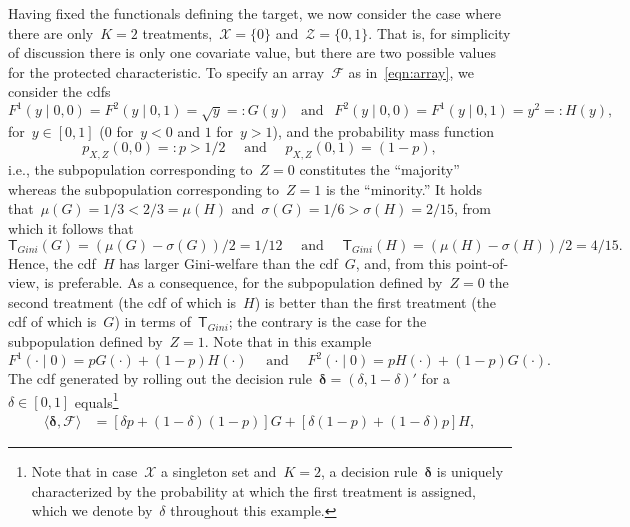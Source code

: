 \documentclass[11pt, a4paper]{article}
\theoremstyle{definition}
\begin{document}
Having fixed the functionals defining the target, we now consider the case where there are only~$K = 2$ treatments,~$\mathcal{X} = \{0\}$ and~$\mathcal{Z} = \{0, 1\}$. That is, for simplicity of discussion there is only one covariate value, but there are two possible values for the protected characteristic. To specify an array~$\mathcal{F}$ as in~\eqref{eqn:array}, we consider the cdfs
%
\begin{equation}\label{eqn:exFdef}
F^1(y\mid 0, 0) = F^2(y\mid 0, 1) = \sqrt{y} =: G(y)  ~~ \text{ and } ~~ F^2(y\mid 0, 0) =  F^1(y\mid 0, 1) = y^2 =: H(y),
\end{equation}
%
for~$y \in [0, 1]$ ($0$ for~$y < 0$ and $1$ for~$y > 1$), and the probability mass function~$$p_{X, Z}(0, 0) =: p > 1/2\quad \text{ and } \quad p_{X, Z}(0, 1) = (1-p),$$ i.e., the subpopulation corresponding to~$Z = 0$ constitutes the ``majority'' whereas the subpopulation corresponding to~$Z = 1$ is the ``minority.'' It holds that~$\mu(G) = 1/3 < 2/3 = \mu(H)$ and~$\sigma(G) = 1/6 > \sigma(H) = 2/15$, from which it follows that~$$\mathsf{T}_{Gini}(G) = (\mu(G) - \sigma(G))/2 = 1/12 \quad \text{ and } \quad \mathsf{T}_{Gini}(H) = (\mu(H) - \sigma(H))/2 = 4/15.$$ Hence, the cdf~$H$ has larger Gini-welfare than the cdf~$G$, and, from this point-of-view, is preferable. As a consequence, for the subpopulation defined by~$Z = 0$ the second treatment (the cdf of which is~$H$) is better than the first treatment (the cdf of which is~$G$) in terms of~$\mathsf{T}_{Gini}$; the contrary is the case for the subpopulation defined by~$Z = 1$. Note that in this example
%
\begin{equation*}
F^1(\cdot\mid 0) = p G(\cdot) + (1-p) H(\cdot) \quad \text{ and } \quad 
F^2(\cdot\mid 0) = p H(\cdot) + (1-p) G(\cdot).
\end{equation*}
%
The cdf generated by rolling out the decision rule~$\bm{\delta} = (\delta, 1-\delta)'$ for a~$\delta \in [0, 1]$ equals\footnote{Note that in case~$\mathcal{X}$ a singleton set and~$K = 2$, a decision rule~$\bm{\delta}$ is uniquely characterized by the probability at which the first treatment is assigned, which we denote by~$\delta$ throughout this example.}
%
\begin{equation*}
\begin{aligned}
\langle \bm{\delta}, \mathcal{F} \rangle &= 
\left[\delta p + (1-\delta)(1-p)\right]G + \left[\delta(1-p) + (1-\delta)p\right]H, %
\end{aligned}
\end{equation*}
\end{document}
